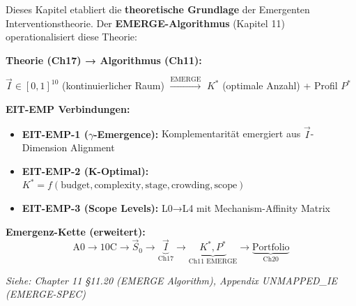 \begin{tcolorbox}[colback=blue!5!white, colframe=blue!75!black,
    title=\textbf{Cross-Reference: EMERGE Algorithm (Chapter 11, EIT-EMP)}]

Dieses Kapitel etabliert die \textbf{theoretische Grundlage} der Emergenten Interventionstheorie. Der \textbf{EMERGE-Algorithmus} (Kapitel 11) operationalisiert diese Theorie:

\vspace{0.2cm}
\textbf{Theorie (Ch17) → Algorithmus (Ch11):}
\begin{center}
\small
$\vec{I} \in [0,1]^{10}$ (kontinuierlicher Raum) $\xrightarrow{\text{EMERGE}}$ $K^*$ (optimale Anzahl) + Profil $P^*$
\end{center}

\textbf{EIT-EMP Verbindungen:}
\begin{itemize}[nosep]
\item \textbf{EIT-EMP-1 ($\gamma$-Emergence):} Komplementarität emergiert aus $\vec{I}$-Dimension Alignment
\item \textbf{EIT-EMP-2 (K-Optimal):} $K^* = f(\text{budget}, \text{complexity}, \text{stage}, \text{crowding}, \text{scope})$
\item \textbf{EIT-EMP-3 (Scope Levels):} L0→L4 mit Mechanism-Affinity Matrix
\end{itemize}

\vspace{0.2cm}
\textbf{Emergenz-Kette (erweitert):}
\begin{equation*}
\text{A0} \to \text{10C} \to \vec{S}_0 \to \underbrace{\vec{I}}_{\text{Ch17}} \to \underbrace{K^*, P^*}_{\text{Ch11 EMERGE}} \to \underbrace{\text{Portfolio}}_{\text{Ch20}}
\end{equation*}

\vspace{0.2cm}
\textit{Siehe: Chapter 11 §11.20 (EMERGE Algorithm), Appendix UNMAPPED_IE (EMERGE-SPEC)}
\end{tcolorbox}

